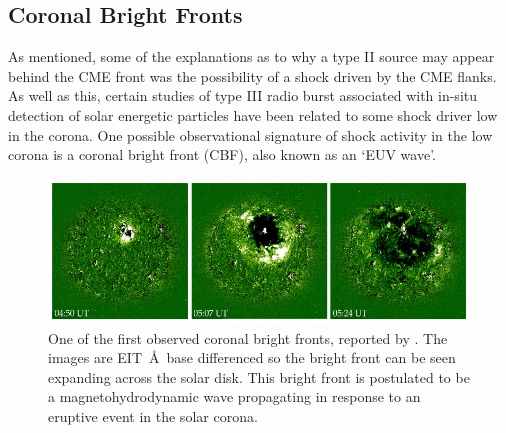\subsection{Coronal Bright Fronts}
As mentioned, some of the explanations as to why a type II source may appear behind the CME front was the possibility of a shock driven by the CME flanks. As well as this, certain studies of type III radio burst associated with in-situ detection of solar energetic particles have been related to some shock driver low in the corona. One possible observational signature of shock activity in the low corona is a coronal bright front (CBF), also known as an \textquoteleft EUV wave'.
\begin{figure}[!t]
\begin{center}
\includegraphics[scale=0.5, trim=0cm 0cm 0cm 1cm]{images/eit_19970512_wave}
\caption[First observation of an \textquoteleft EIT wave']{One of the first observed coronal bright fronts, reported by \citep{thompson1998}. The images are EIT \,\AA\, base differenced so the bright front can be seen expanding across the solar disk. This bright front is postulated to be a magnetohydrodynamic wave propagating in response to an eruptive event in the solar corona.}
\label{fig:cbf}
\end{center}
\end{figure}

